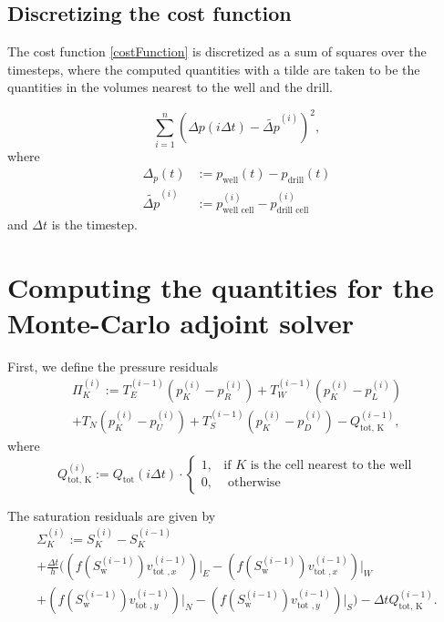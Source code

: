 \documentclass[conference]{IEEEtran}
\begin{document}
\subsection{Discretizing the cost function}
The cost function \eqref{costFunction} is discretized as a sum of squares over the timesteps, where the computed quantities with a tilde are taken to be the quantities in the volumes nearest to the well and the drill.

\begin{equation}
\sum_{i=1}^{n} (\Delta p(i\Delta t) - \tilde{\Delta p}^{(i)})^2,
\end{equation}
where
\begin{align}
\Delta_p(t) &:= p_\text{well}(t) - p_\text{drill}(t) \\
\tilde{\Delta p}^{(i)} &:= p_\text{well cell}^{(i)} - p_\text{drill cell}^{(i)}
\end{align}
and $\Delta t$ is the timestep.

\section{Computing the quantities for the Monte-Carlo adjoint solver}

First, we define the pressure residuals
\begin{multline}
\Pi_K^{(i)} := T_E^{(i-1)} (p_K^{(i)} - p_R^{(i)}) + T_W^{(i-1)} (p_K^{(i)} - p_L^{(i)}) \\+ T_N ( p_K^{(i)} - p_U^{(i)}) + T_S^{(i-1)} (p_K^{(i)} - p_D^{(i)}) - Q_\text{tot, K}^{(i-1)}, 
\end{multline}
where
\begin{equation}
Q_\text{tot, K}^{(i)} := Q_\text{tot}(i\Delta t) \cdot \begin{cases} 1, &\text{if } K \text{ is the cell nearest to the well}\\0, &\text{ otherwise} \end{cases}
\end{equation}

The saturation residuals are given by
\begin{multline}
\Sigma_K^{(i)} := S_K^{(i)} - S_K^{(i-1)} \\+ \frac{\Delta t}{h} \biggr((f(S_\text{w}^{(i-1)})v_{\text{tot }, x}^{(i-1)})\lvert_E - (f(S_\text{w}^{(i-1)})v_{\text{tot }, x}^{(i-1)})\lvert_W \\+ (f(S_\text{w}^{(i-1)})v_{\text{tot }, y}^{(i-1)})\lvert_N - (f(S_\text{w}^{(i-1)})v_{\text{tot }, y}^{(i-1)})\lvert_S\biggr) - \Delta t Q_\text{tot, K}^{(i-1)}.
\end{multline}
\end{document}
